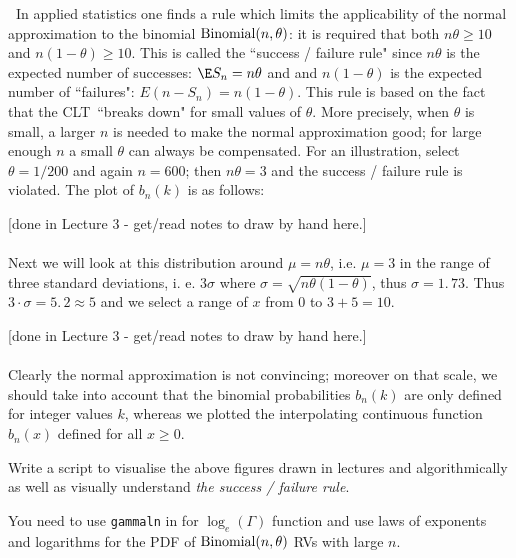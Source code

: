 \textbf{\ }In applied statistics one finds a rule which limits the
applicability of the normal approximation to the binomial $\mbox{{\rm Binomial}}(n,\theta)$: it is
required that both $n\theta\geq 10$ and $n(1-\theta)\geq 10$. This is called the
``success / failure rule"  since $n\theta$ is the expected number of successes: $%
\E S_{n}=n\theta$ and and $n(1-\theta)$ is the expected number of ``failures": $E\left(
n-S_{n}\right) =n(1-\theta)$. This rule is based on the fact that the CLT\
``breaks down" for small values of $\theta$. More precisely, when $\theta$ is small, a
larger $n$ is needed to make the normal approximation good; for large enough 
$n$ a small $\theta$ can always be compensated. For an illustration, select $%
\theta=1/200$ and again $n=600$; then $n\theta=3$ and the success / failure rule is
violated. The plot of $b_{n}(k)$ is as follows:


{\scriptsize [done in Lecture 3 - get/read notes to draw by hand here.]}\\
\vspace{3cm} 
~\\


Next we will look at this distribution around $\mu =n\theta$, i.e. $%
\mu =3$ in the range of three standard deviations, i. e. $3\sigma $ where $%
\sigma =\sqrt{n\theta(1-\theta)}$, thus $\sigma =1.\,73$. Thus $3\cdot \sigma
=5.\,2\approx 5$ and we select a range of $x$ from $0$ to $3+5=10$. 


{\scriptsize [done in Lecture 3 - get/read notes to draw by hand here.]}\\
\vspace{3cm} 
~\\


Clearly the normal
approximation is not convincing; moreover on that scale, we should take into
account that the binomial probabilities $b_{n}(k)$ are only defined for
integer values $k$, whereas we plotted the interpolating continuous function 
$b_{n}(x)$ defined for all $x\geq 0$.

\begin{labwork}\label{LW:VisualiseSuccessFailureRule}
Write a \Matlab script to visualise the above figures drawn in lectures and algorithmically as well as visually understand {\em the success / failure rule}.

You need to use {\tt gammaln} in \Matlab for $\log_e(\Gamma)$ function and use laws of exponents and logarithms for the PDF of $\mbox{{\rm Binomial}}(n,\theta)$ RVs with large $n$.
\end{labwork}

